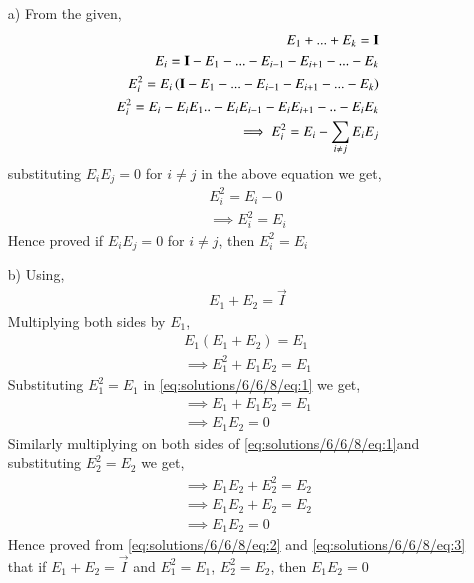 \begin{enumerate}
\item[a)]From the given,
\begin{align}
E_1+...+E_k =\mathbf{I}\\
E_i = \mathbf{I}-E_1-...-E_{i-1}-E_{i+1}-...-E_k\\
E_i^2 = E_i\left(\mathbf{I}-E_1-...-E_{i-1}-E_{i+1}-...-E_k\right)\\
E_i^2 = E_i-E_iE_1..-E_iE_{i-1}-E_iE_{i+1}-..-E_iE_k\\
\implies E_i^2 = E_i -\sum_{i\neq j}E_iE_j
\end{align}
substituting $E_iE_j = 0$ for $i\neq j$ in the above equation we get,
\begin{align}
E_i^2 = E_i -0\\
\implies E_i^2 = E_i
\end{align}
Hence proved if $E_iE_j = 0$ for $i\neq j$, then $E_i^2=E_i$
\item[b)] Using,
\begin{align}
E_1+E_2=\vec{I} \label{eq:solutions/6/6/8/eq:1}
\end{align}
Multiplying both sides by $E_1$,
\begin{align}
E_1(E_1+E_2) = E_1 \\
\implies E_1^2 +E_1E_2 = E_1 
\end{align}
Substituting $E_1^2=E_1$ in \eqref{eq:solutions/6/6/8/eq:1} we get,
\begin{align}
\implies E_1 +E_1E_2 = E_1\\
\implies E_1E_2 = 0 \label{eq:solutions/6/6/8/eq:2}
\end{align}
Similarly multiplying on both sides of \eqref{eq:solutions/6/6/8/eq:1}and substituting $E_2^2= E_2$ we get,
\begin{align}
\implies E_1E_2+ E_2^2 =E_2\\
\implies E_1E_2 +E_2 =E_2\\
\implies E_1E_2= 0 \label{eq:solutions/6/6/8/eq:3}
\end{align}
Hence proved from \eqref{eq:solutions/6/6/8/eq:2} and \eqref{eq:solutions/6/6/8/eq:3} that if $E_1+E_2=\vec{I}$ and $E_1^2 = E_1$, $E_2^2= E_2$, then $E_1E_2=0$
\end{enumerate}
